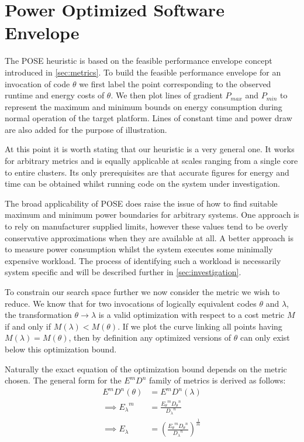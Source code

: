 \section{Power Optimized Software Envelope}
\label{sec:pose}

The POSE heuristic is based on the feasible performance envelope concept introduced in \autoref{sec:metrics}.
To build the feasible performance envelope for an invocation of code $\theta$ we first label the point corresponding to the observed runtime and energy costs of $\theta$.
We then plot lines of gradient $P_{max}$ and $P_{min}$ to represent the maximum and minimum bounds on energy consumption during normal operation of the target platform.
Lines of constant time and power draw are also added for the purpose of illustration.

At this point it is worth stating that our heuristic is a very general one.
It works for arbitrary metrics and is equally applicable at scales ranging from a single core to entire clusters.
Its only prerequisites are that accurate figures for energy and time can be obtained whilst running code on the system under investigation.

The broad applicability of POSE does raise the issue of how to find suitable maximum and minimum power boundaries for arbitrary systems. 
One approach is to rely on manufacturer supplied limits, however these values tend to be overly conservative approximations when they are available at all.
A better approach is to measure power consumption whilst the system executes some minimally expensive workload. 
The process of identifying such a workload is necessarily system specific and will be described further in \autoref{sec:investigation}.

To constrain our search space further we now consider the metric we wish to reduce. We know that for two invocations of logically equivalent codes $\theta$ and $\lambda$, the transformation $\theta \to \lambda$ is a valid optimization with respect to a cost metric $M$ if and only if $M(\lambda) < M(\theta)$. If we plot the curve linking all points having $M(\lambda) = M(\theta)$, then by definition any optimized versions of $\theta$ can only exist below this optimization bound.

Naturally the exact equation of the optimization bound depends on the metric chosen. 
The general form for the $E^mD^n$ family of metrics is derived as follows:
\begin{align}
E^mD^n(\theta) &= E^mD^n(\lambda) \nonumber \\
\implies {E_\lambda}^m &= \frac{{E_\theta}^m{D_\theta}^n}{{D_\lambda}^n} \nonumber \\
\implies E_\lambda &= (\frac{{E_\theta}^m{D_\theta}^n}{{D_\lambda}^n})^\frac{1}{m}
\end{align}

